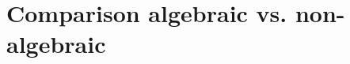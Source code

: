 

\section{Comparison algebraic vs. non-algebraic}
\label{app:alg-non-alg-comparison}







% 


% 


% 


% 

